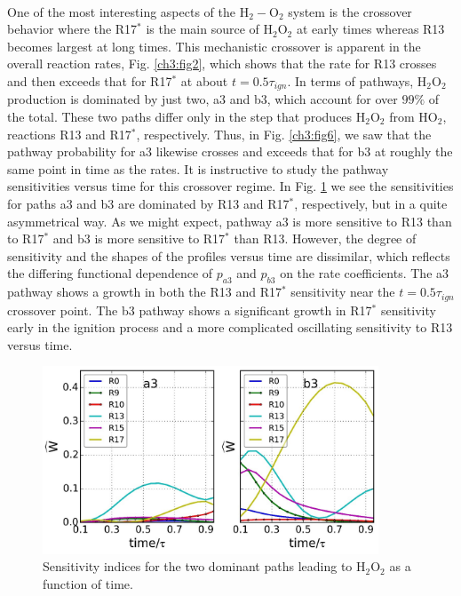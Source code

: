 \paragraph{}
\newline
\paragraph{}
One of the most interesting aspects of the H$_2-$O$_2$ system is
the crossover behavior where the R17$^{\ast}$ is the main source of
H$_2$O$_2$ at early times whereas R13 becomes largest at long times.
This mechanistic crossover is apparent in the overall reaction
rates, Fig. \ref{ch3:fig2}, which shows that the rate for R13 crosses and
then exceeds that for R17$^{\ast}$ at about $t=0.5\tau_{ign}$. In terms of pathways, H$_2$O$_2$ production is dominated by just two, a3 and b3, which account for over $99\%$ of the total. These two paths
differ only in the step that produces H$_2$O$_2$ from HO$_2$, reactions
R13 and R17$^{\ast}$, respectively. Thus, in Fig. \ref{ch3:fig6}, we saw that the
pathway probability for a3 likewise crosses and exceeds that for
b3 at roughly the same point in time as the rates. It is
instructive to study the pathway sensitivities versus time for this
crossover regime. In Fig. \ref{ch3:fig16} we see the sensitivities for paths
a3 and b3 are dominated by R13 and R17$^{\ast}$, respectively, but in
a quite asymmetrical way. As we might expect, pathway a3 is
more sensitive to R13 than to R17$^{\ast}$ and b3 is more sensitive to
R17$^{\ast}$ than R13. However, the degree of sensitivity and the
shapes of the profiles versus time are dissimilar, which reflects
the differing functional dependence of $p_{a3}$ and $p_{b3}$ on the rate
coefficients. The a3 pathway shows a growth in both the R13
and R17$^{\ast}$ sensitivity near the $t=0.5\tau_{ign}$ crossover point. The b3
pathway shows a significant growth in R17$^{\ast}$ sensitivity early in
the ignition process and a more complicated oscillating
sensitivity to R13 versus time.
\begin{figure}[htbp]
	\caption[Sensitivity indices for the two dominant paths leading to
H$_2$O$_2$]{Sensitivity indices for the two dominant paths leading to
H$_2$O$_2$ as a function of time.}
    \begin{center}
	\includegraphics[width=100mm]{figs/chapter3/fig16.jpg}
    \end{center}
\label{ch3:fig16}
\end{figure}
\newline
